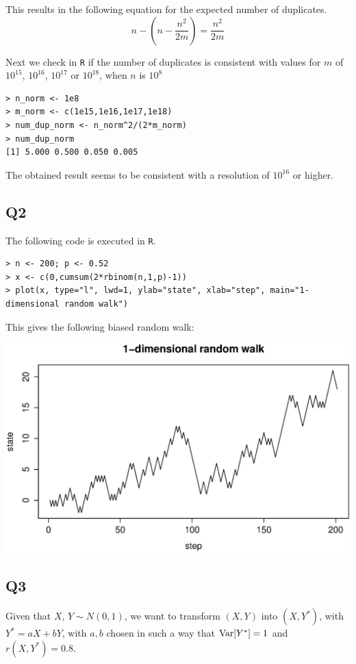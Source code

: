 This results in the following equation for the expected number of duplicates.
\begin{displaymath}
n - \left(n - \frac{n^2}{2m}\right) = \frac{n^2}{2m}
\end{displaymath}

Next we check in \verb|R| if the number of duplicates is consistent with values for $m$ of $10^{15}$, $10^{16}$, $10^{17}$ or $10^{18}$, when $n$ is $10^8$
\begin{verbatim}
> n_norm <- 1e8
> m_norm <- c(1e15,1e16,1e17,1e18)
> num_dup_norm <- n_norm^2/(2*m_norm)
> num_dup_norm
[1] 5.000 0.500 0.050 0.005
\end{verbatim}

The obtained result seems to be consistent with a resolution of $10^{16}$ or higher.
 
\subsection*{Q2}
The following code is executed in \verb|R|.
\begin{verbatim}
> n <- 200; p <- 0.52
> x <- c(0,cumsum(2*rbinom(n,1,p)-1))
> plot(x, type="l", lwd=1, ylab="state", xlab="step", main="1-dimensional random walk")
\end{verbatim}
This gives the following biased random walk:

\includegraphics[scale=.6]{NL1_Q2_1D-randomwalk.eps} 

\subsection*{Q3}

Given that $X$, $Y \sim N(0,1)$, we want to transform $(X, Y)$ into $(X, Y^*)$, with $Y^* = aX + bY$, with $a, b$ chosen in such a way that $\operatorname{\text{Var}}[Y^*] = 1$ and $r(X, Y^*) = 0.8$.

